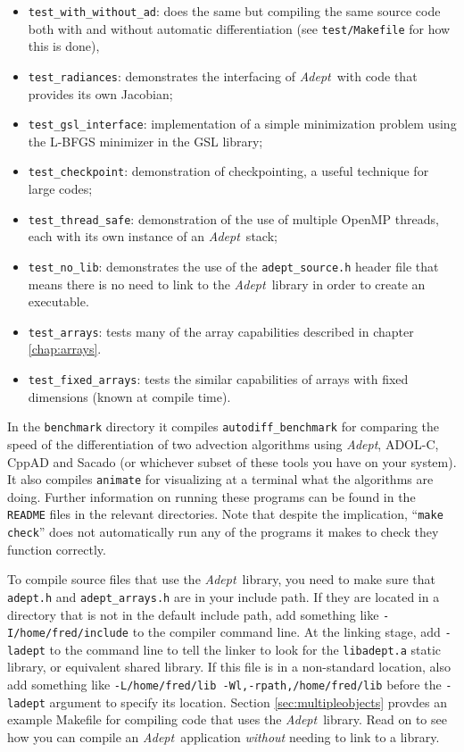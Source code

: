 \documentclass[a4,oneside]{book}
\def\codesize{\small}
\def\Adept{\emph{Adept}}
\def\code#1{{\codesize\texttt{#1}}}
\begin{document}
\begin{enumerate}
\begin{itemize}
\item\code{test\_with\_without\_ad}: does the same but compiling the
  same source code both with and without automatic differentiation
  (see \code{test/Makefile} for how this is done),
\item\code{test\_radiances}: demonstrates the interfacing of
  \Adept\ with code that provides its own Jacobian;
\item\code{test\_gsl\_interface}: implementation of a simple minimization
  problem using the L-BFGS minimizer in the GSL library;
\item\code{test\_checkpoint}: demonstration of checkpointing, a useful
  technique for large codes;
\item\code{test\_thread\_safe}: demonstration of the use of multiple
  OpenMP threads, each with its own instance of an \Adept\ stack;
\item\code{test\_no\_lib}: demonstrates the use of the
  \code{adept\_source.h} header file that means there is no need to
  link to the \Adept\ library in order to create an executable.
\item\code{test\_arrays}: tests many of the array capabilities
  described in chapter \ref{chap:arrays}.
\item\code{test\_fixed\_arrays}: tests the similar capabilities of
  arrays with fixed dimensions (known at compile time).
\end{itemize}
In the \code{benchmark} directory it compiles
\code{autodiff\_benchmark} for comparing the speed of the
differentiation of two advection algorithms using \Adept, ADOL-C,
CppAD and Sacado (or whichever subset of these tools you have on your
system).  It also compiles \code{animate} for visualizing at a
terminal what the algorithms are doing.  Further information on
running these programs can be found in the \code{README} files in the
relevant directories.  Note that despite the implication, ``\code{make
  check}'' does not automatically run any of the programs it makes to
check they function correctly.
\end{enumerate}

To compile source files that use the \Adept\ library, you need to make
sure that \code{adept.h} and \code{adept\_arrays.h} are in your
include path. If they are located in a directory that is not in the
default include path, add something like \code{-I/home/fred/include}
to the compiler command line. At the linking stage, add \code{-ladept}
to the command line to tell the linker to look for the
\code{libadept.a} static library, or equivalent shared library. If
this file is in a non-standard location, also add something like
\code{-L/home/fred/lib -Wl,-rpath,/home/fred/lib} before the
\code{-ladept} argument to specify its location. Section
\ref{sec:multipleobjects} provdes an example Makefile for compiling
code that uses the \Adept\ library. Read on to see how you can compile
an \Adept\ application \emph{without} needing to link to a library.
\end{document}
